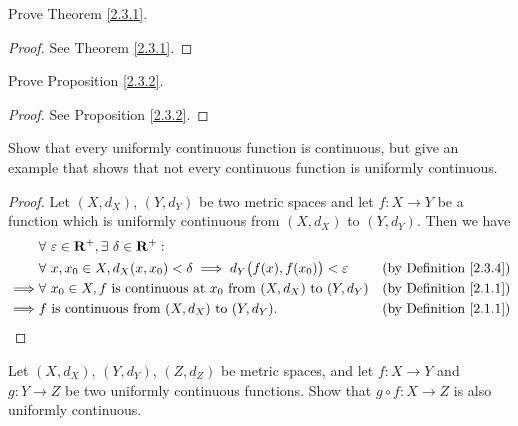 \exercisesection

\begin{exercise}\label{ex 2.3.1}
    Prove Theorem \ref{2.3.1}.
\end{exercise}

\begin{proof}
    See Theorem \ref{2.3.1}.
\end{proof}

\begin{exercise}\label{ex 2.3.2}
    Prove Proposition \ref{2.3.2}.
\end{exercise}

\begin{proof}
    See Proposition \ref{2.3.2}.
\end{proof}

\begin{exercise}\label{ex 2.3.3}
    Show that every uniformly continuous function is continuous, but give an example that shows that not every continuous function is uniformly continuous.
\end{exercise}

\begin{proof}
    Let \((X, d_X)\), \((Y, d_Y)\) be two metric spaces and let \(f : X \to Y\) be a function which is uniformly continuous from \((X, d_X)\) to \((Y, d_Y)\).
    Then we have
    \begin{align*}
                 & \forall\ \varepsilon \in \mathbf{R}^+, \exists\ \delta \in \mathbf{R}^+ :                                                            \\
                 & \forall\ x, x_0 \in X, d_X(x, x_0) < \delta \implies d_Y\big(f(x), f(x_0)\big) < \varepsilon    & \text{(by Definition \ref{2.3.4})} \\
        \implies & \forall\ x_0 \in X, f \text{ is continuous at } x_0 \text{ from } (X, d_X) \text{ to } (Y, d_Y) & \text{(by Definition \ref{2.1.1})} \\
        \implies & f \text{ is continuous from } (X, d_X) \text{ to } (Y, d_Y).                                    & \text{(by Definition \ref{2.1.1})}
    \end{align*}
\end{proof}

\begin{exercise}\label{ex 2.3.4}
    Let \((X, d_X)\), \((Y, d_Y)\), \((Z, d_Z)\) be metric spaces, and let \(f : X \to Y\) and \(g : Y \to Z\) be two uniformly continuous functions.
    Show that \(g \circ f : X \to Z\) is also uniformly continuous.
\end{exercise}


